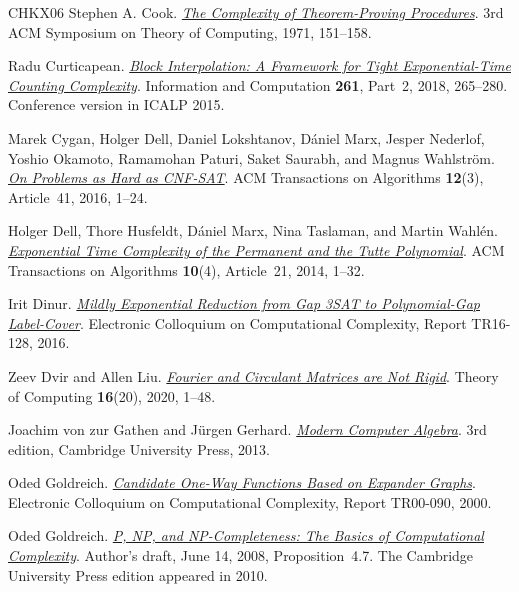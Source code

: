 \documentclass[11pt,reqno]{amsart}
\numberwithin{equation}{section}
\theoremstyle{definition}\newtheorem{definition}[theorem]{Definition}
\theoremstyle{remark}\newtheorem{remark}[theorem]{Remark}
\begin{document}
\begin{thebibliography}{CHKX06}
Stephen A. Cook.
\href{https://www.cs.utoronto.ca/~sacook/homepage/1971.pdf}
{\emph{The Complexity of Theorem-Proving Procedures}}.
3rd ACM Symposium on Theory of Computing, 1971, 151--158.

Radu Curticapean.
\href{https://doi.org/10.1016/j.ic.2018.02.008}
{\emph{Block Interpolation: A Framework for Tight Exponential-Time
Counting Complexity}}.
Information and Computation \textbf{261}, Part~2, 2018, 265--280.
Conference version in ICALP 2015.

Marek Cygan, Holger Dell, Daniel Lokshtanov, D\'aniel Marx,
Jesper Nederlof, Yoshio Okamoto, Ramamohan Paturi, Saket Saurabh,
and Magnus Wahlstr\"om.
\href{https://doi.org/10.1145/2925416}
{\emph{On Problems as Hard as CNF-SAT}}.
ACM Transactions on Algorithms \textbf{12}(3), Article~41, 2016, 1--24.

Holger Dell, Thore Husfeldt, D\'aniel Marx, Nina Taslaman, and Martin Wahl\'en.
\href{https://arxiv.org/abs/1206.1775}
{\emph{Exponential Time Complexity of the Permanent and the Tutte Polynomial}}.
ACM Transactions on Algorithms \textbf{10}(4), Article~21, 2014, 1--32.

Irit Dinur.
\href{https://eccc.weizmann.ac.il/report/2016/128/}
{\emph{Mildly Exponential Reduction from Gap 3SAT to Polynomial-Gap
Label-Cover}}.
Electronic Colloquium on Computational Complexity, Report TR16-128, 2016.

Zeev Dvir and Allen Liu.
\href{https://theoryofcomputing.org/articles/v016a020/}
{\emph{Fourier and Circulant Matrices are Not Rigid}}.
Theory of Computing \textbf{16}(20), 2020, 1--48.

Joachim von zur Gathen and J\"urgen Gerhard.
\href{https://doi.org/10.1017/CBO9781139856065}{\emph{Modern Computer Algebra}}.
3rd edition, Cambridge University Press, 2013.

Oded Goldreich.
\href{https://eccc.weizmann.ac.il/eccc-reports/2000/TR00-090/index.html}
{\emph{Candidate One-Way Functions Based on Expander Graphs}}.
Electronic Colloquium on Computational Complexity, Report TR00-090, 2000.

Oded Goldreich.
\href{https://www.wisdom.weizmann.ac.il/~oded/CC/bc-1.pdf}
{\emph{P, NP, and NP-Completeness: The Basics of Computational Complexity}}.
Author's draft, June 14, 2008, Proposition~4.7.
The Cambridge University Press edition appeared in 2010.


\end{thebibliography}
\end{document}
